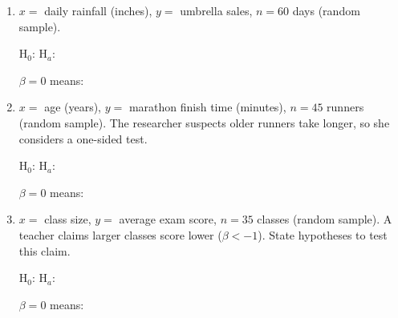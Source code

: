 \documentclass[10pt]{article}
\begin{document}
\begin{enumerate}[label=\alph*.]

  \item $x = $ daily rainfall (inches), $y = $ umbrella sales, $n = 60$ days
        (random sample).

        H$_0$: \blank{7cm} \quad H$_a$: \blank{7cm}

        $\beta = 0$ means: 

  \item $x = $ age (years), $y = $ marathon finish time (minutes), $n = 45$ runners
        (random sample). The researcher suspects older runners take longer, so she
        considers a one-sided test.

        H$_0$: \blank{7cm} \quad H$_a$: \blank{7cm}

        $\beta = 0$ means: 

  \item $x = $ class size, $y = $ average exam score, $n = 35$ classes (random sample).
        A teacher claims larger classes score lower ($\beta < -1$). State hypotheses
        to test this claim.

        H$_0$: \blank{7cm} \quad H$_a$: \blank{7cm}

        $\beta = 0$ means: 

\end{enumerate}
\end{document}
